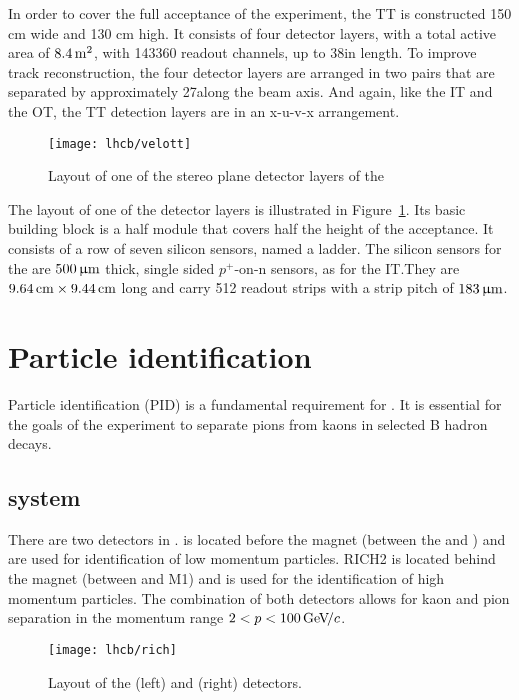 In order to cover the full acceptance of the experiment, the TT is constructed
150 cm wide and 130 cm high. It consists of four detector layers, with a total
active area of $8.4\rm \,m^2$, with 143360 readout channels, up to 38\cm in length.
To improve track reconstruction, the four detector layers are arranged in two
pairs that are separated by approximately 27\cm along the \lhcb beam axis. And
again, like the IT and the OT, the TT detection layers are in an x-u-v-x
arrangement.

\begin{figure}[tb]
\begin{center}
\texttt{[image: lhcb/velott]}
\end{center}
\caption{\small Layout of one of the stereo plane detector layers of the \ttracker}
\label{fig:velott}
\end{figure}


The layout of one of the detector layers is illustrated in
Figure~\ref{fig:velott}. Its basic building block is a half module that covers
half the height of the \lhcb acceptance. It consists of a row of seven silicon
sensors, named a ladder. The silicon sensors for the \ttracker are $500{\,\upmu\rm m}$
thick, single sided $p^+$-on-n sensors, as for the IT.\@ They are
$9.64\rm \,cm\times9.44\rm \,cm$ long and carry 512 readout strips with a strip pitch of
$183{\,\upmu\rm m}$.

\section{Particle identification}

Particle identification (PID) is a fundamental requirement for \lhcb. It is
essential for the goals of the experiment to separate pions from kaons in
selected B hadron decays.

\subsection{\rich system}

There are two \rich detectors in \lhcb. \richone is located before the magnet
(between the \velo and \ttracker) and are used for identification of low momentum
particles. RICH2 is located behind the magnet (between \ot and M1) and is
used for the identification of high momentum particles. The combination of both
detectors allows for kaon and pion separation in the momentum range $2 < p <
100 {\mathrm{\,Ge\kern -0.1em V\!/}c}$.

\begin{figure}[tb]
\centering
\texttt{[image: lhcb/rich]}
\caption{\small Layout of the \richone(left) and \richtwo(right) detectors.}
\label{fig:rich}
\end{figure}

